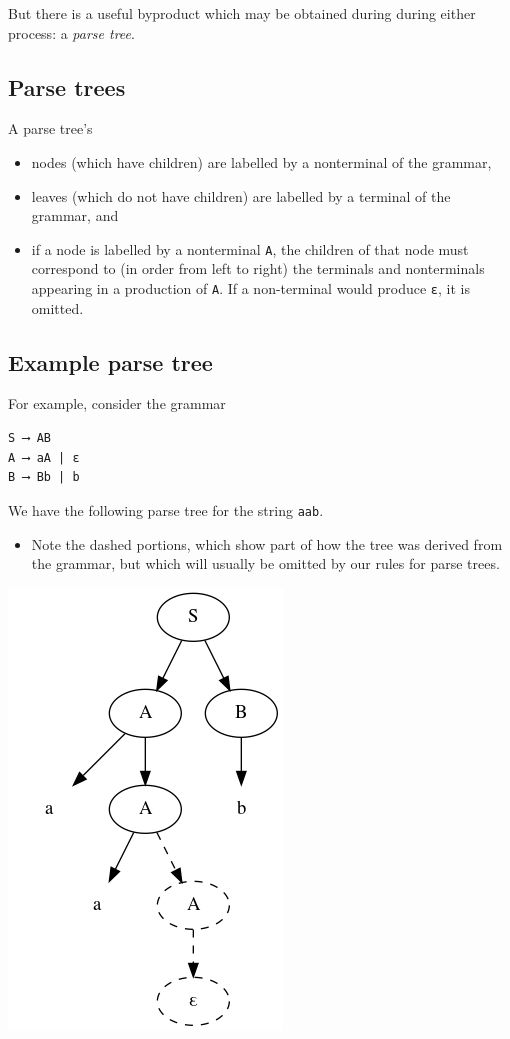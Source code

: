 \documentclass[11pt]{article}
\theoremstyle{definition}
\begin{document}
But there is a useful byproduct which may be obtained during
during either process: a \emph{parse tree}.

\subsection{Parse trees}
\label{sec:orga475d8c}
A parse tree's
\begin{itemize}
\item nodes (which have children) are
labelled by a nonterminal of the grammar,
\item leaves (which do not have children) are
labelled by a terminal of the grammar, and
\item if a node is labelled by a nonterminal \texttt{A},
the children of that node must correspond to
(in order from left to right)
the terminals and nonterminals appearing in a production of \texttt{A}.
If a non-terminal would produce \texttt{ε}, it is omitted.
\end{itemize}

\subsection{Example parse tree}
\label{sec:orgb22edea}
For example, consider the grammar
\begin{verbatim}
S ⟶ AB
A ⟶ aA | ε
B ⟶ Bb | b
\end{verbatim}

We have the following parse tree for the string \texttt{aab}.
\begin{itemize}
\item Note the dashed portions, which show part of how the tree
was derived from the grammar,
but which will usually be omitted by our rules for parse trees.
\end{itemize}
\includegraphics{media/parse-tree-example-aab.png}
\end{document}
